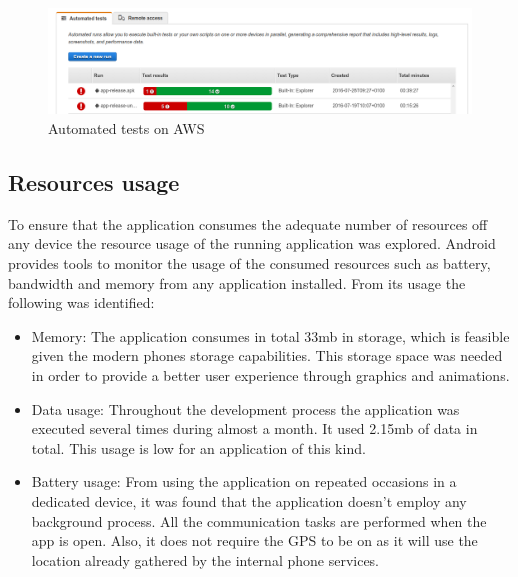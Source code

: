 \begin{figure}[H]
\begin{adjustbox}{width=1\textwidth,center=\textwidth}
  \centering
  \includegraphics[scale=1]{images/automated_tests.png}
\end{adjustbox}
  \caption[Automated tests on AWS]{Automated tests on AWS}
  \label{fig:automated_tests}
\end{figure}

\subsection{Resources usage}
To ensure that the application consumes the adequate number of resources off any device the resource usage of the running application was explored. Android provides tools to monitor the usage of the consumed resources such as battery, bandwidth and memory from any application installed. From its usage the following was identified:
\begin{itemize}
    \item Memory: The application consumes in total 33mb in storage, which is feasible given the modern phones storage capabilities. This storage space was needed in order to provide a better user experience through graphics and animations.
    \item Data usage: Throughout the development process the application was executed several times during almost a month. It used 2.15mb of data in total. This usage is low for an application of this kind.
    \item Battery usage: From using the application on repeated occasions in a dedicated device, it was found that the application doesn't employ any background process. All the communication tasks are performed when the app is open. Also, it does not require the GPS to be on as it will use the location already gathered by the internal phone services.
\end{itemize}



